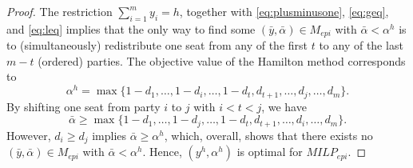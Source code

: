 \documentclass[12pt]{article}
\begin{document}
\begin{proof}
The restriction $\sum_{i=1}^m y_i  =  h$, together with \eqref{eq:plusminusone}, \eqref{eq:geq}, and \eqref{eq:leq} implies that the only way to find some $(\bar y, \bar \alpha) \in M_{epi}$ with $\bar \alpha < \alpha^h$ is to (simultaneously) redistribute one seat from any of the first $t$ to any of the last $m-t$ (ordered) parties. The objective value of the Hamilton method corresponds to \[\alpha^h = \max\{1-d_1, \dots, 1-d_i, \dots, 1-d_t, d_{t+1}, \dots, d_{j}, \dots, d_m\}.\] By shifting one seat from party $i$ to $j$ with $i<t<j$, we have \[\bar \alpha \geq \max \{1-d_1, \dots, 1-d_j, \dots, 1-d_t, d_{t+1}, \dots, d_i, \dots, d_m\}.\] However, $d_i \geq d_j$ implies $\bar \alpha \geq \alpha^h$, which, overall, shows that there exists no $(\bar y, \bar \alpha) \in M_{epi}$ with $\bar \alpha < \alpha^h$. Hence, $(y^h,\alpha^h)$ is optimal for $MILP_{epi}$.

\end{proof}
\end{document}
